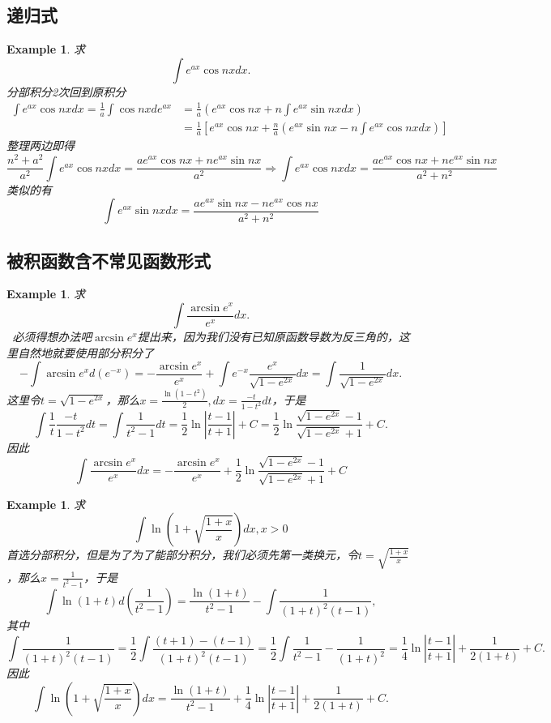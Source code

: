 \documentclass{article}
\newtheorem{example}[theorem]{Example}
\newcommand{\hints}{{\color{blue} \text{hints}}}
\begin{document}
\subsection{递归式}

\begin{example}
\rm 求
$$
\int e^{ax}\cos nx dx.
$$
\hints 分部积分2次回到原积分
$$
\begin{array}{ll}
\int e^{ax}\cos nx dx = \frac{1}{a}\int \cos nx d e^{ax}  &= \frac{1}{a}\left(e^{ax}\cos nx + n \int e^{ax}\sin nx dx \right) \\
&= \frac{1}{a}\left[ e^{ax}\cos nx + \frac{n}{a} \left( e^{ax}\sin nx - n\int e^{ax}\cos nxdx \right) \right]
\end{array}
$$
整理两边即得
$$
\frac{n^2 + a^2}{a^2} \int e^{ax}\cos nx dx = \frac{ae^{ax}\cos nx + ne^{ax}\sin nx}{a^2} \Rightarrow \int e^{ax}\cos nx dx = \frac{ae^{ax}\cos nx + ne^{ax}\sin nx}{a^2+n^2}
$$
类似的有
$$
\int e^{ax}\sin nx dx = \frac{ae^{ax}\sin nx - ne^{ax}\cos nx}{a^2+n^2}
$$
\end{example}


\subsection{被积函数含不常见函数形式}

\begin{example}
\rm 求
$$
\int \frac{\arcsin e^x}{e^x}dx. 
$$
\hints\ 必须得想办法吧$\arcsin e^x$提出来，因为我们没有已知原函数导数为反三角的，这里自然地就要使用部分积分了
$$
-\int \arcsin e^x d(e^{-x}) = -\frac{\arcsin e^x}{e^x} + \int e^{-x} \frac{e^x}{\sqrt{1-e^{2x}}}dx = \int \frac{1}{\sqrt{1-e^{2x}}}dx . 
$$
这里令$t=\sqrt{1-e^{2x}}$，那么$x = \frac{\ln(1-t^2)}{2},dx = \frac{-t}{1-t^2}dt$，于是
$$
\int \frac{1}{t} \frac{-t}{1-t^2}dt = \int\frac{1}{t^2-1}dt =  \frac{1}{2}\ln \left| \frac{t-1}{t+1} \right| + C = \frac{1}{2}\ln  \frac{\sqrt{1-e^{2x}}-1}{\sqrt{1-e^{2x}}+1}  + C.  
$$
因此
$$
\int \frac{\arcsin e^x}{e^x}dx = -\frac{\arcsin e^x}{e^x} + \frac{1}{2}\ln  \frac{\sqrt{1-e^{2x}}-1}{\sqrt{1-e^{2x}}+1}  + C  
$$
\end{example}

\begin{example}
\rm 求
$$
\int \ln\left( 1+\sqrt{\frac{1+x}{x}} \right)dx, x>0
$$
\hints 首选分部积分，但是为了为了能部分积分，我们必须先第一类换元，令$t = \sqrt{\frac{1+x}{x}}$，那么$x =\frac{1}{t^2-1}$，于是
$$
\int \ln(1+t)d\left(\frac{1}{t^2-1}\right) = \frac{\ln(1+t)}{{t^2-1}}- \int \frac{1}{(1+t)^2(t-1)},
$$
其中
$$
\int \frac{1}{(1+t)^2(t-1)} = \frac{1}{2}\int \frac{(t+1)-(t-1)}{(1+t)^2(t-1)} = \frac{1}{2} \int \frac{1}{t^2-1} - \frac{1}{(1+t)^2} = \frac{1}{4}\ln\left|\frac{t-1}{t+1} \right| + \frac{1}{2(1+t)} + C. 
$$
因此
$$
\int \ln\left( 1+\sqrt{\frac{1+x}{x}} \right)dx = \frac{\ln(1+t)}{{t^2-1}} + \frac{1}{4}\ln\left|\frac{t-1}{t+1} \right| + \frac{1}{2(1+t)} + C. 
$$
\end{example}
\end{document}

